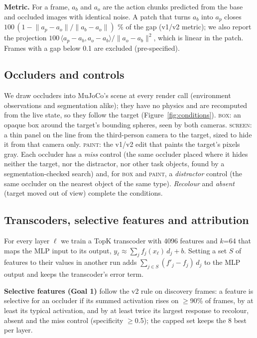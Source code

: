 \documentclass{article}
\begin{document}
\textbf{Metric.} For a frame, $a_{b}$ and $a_{o}$ are the action chunks predicted from the base and occluded images with identical
noise. A patch that turns $a_b$ into $a_p$ closes $100\,(1-\lVert a_p-a_o\rVert/\lVert a_b-a_o\rVert)$ \% of the gap (v1/v2 metric); we
also report the projection $100\,\langle a_p-a_b, a_o-a_b\rangle/\lVert a_o-a_b\rVert^2$, which is linear in the patch. Frames with a gap
below 0.1 are excluded (pre-specified).

\subsection{Occluders and controls}
\label{sec:occluders}
We draw occluders into MuJoCo's scene at every render call (environment observations and segmentation alike); they have no physics and
are recomputed from the live state, so they follow the target (Figure~\ref{fig:conditions}). \textsc{box}: an opaque box around the
target's bounding spheres, seen by both cameras. \textsc{screen}: a thin panel on the line from the third-person camera to the target,
sized to hide it from that camera only. \textsc{paint}: the v1/v2 edit that paints the target's pixels gray. Each occluder has a
\emph{miss} control (the same occluder placed where it hides neither the target, nor the distractor, nor other task objects, found by a
segmentation-checked search) and, for \textsc{box} and \textsc{paint}, a \emph{distractor} control (the same occluder on the
nearest object of the same type). \emph{Recolour} and \emph{absent} (target moved out of view) complete the conditions.

\subsection{Transcoders, selective features and attribution}
For every layer $\ell$ we train a TopK transcoder \citep{dunefsky2024transcoders,gao2025scaling} with 4096 features and
$k$=64 that maps the MLP input to its output, $y_\ell \approx \sum_j f_j(x_\ell)\,d_j + b$. Setting a set $S$ of features to
their values in another run adds $\sum_{j\in S}(f'_j-f_j)\,d_j$ to the MLP output and keeps the transcoder's error term.

\textbf{Selective features (Goal 1)} follow the v2 rule on discovery frames: a feature is selective for an occluder if its summed
activation rises on $\geq$90\% of frames, by at least its typical activation, and by at least
twice its largest response to recolour, absent and the miss control (specificity $\geq$0.5); the capped set keeps
the 8 best per layer.
\end{document}
